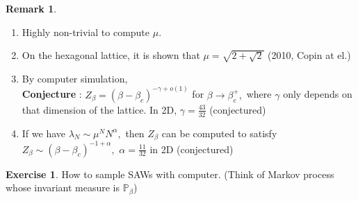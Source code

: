 \documentclass[12pt,a4paper]{report}
\theoremstyle{definition}
\newtheorem*{remark}{Remark}
\newtheorem{ex}{Exercise}
\begin{document}
	\begin{remark} \begin{enumerate}
		\item Highly non-trivial to compute $\mu.$
		\item On the hexagonal lattice, it is shown that $\mu=\sqrt{2+\sqrt{2}}$ (2010, Copin at el.)
		\item By computer simulation,\\
		\textbf{Conjecture} : $Z_\beta=(\beta-\beta_c)^{-\gamma+o(1)}$ for $\beta\to \beta_c^+,$ where $\gamma$ only depends on that dimension of the lattice. In 2D, $\gamma=\frac{43}{32}$ (conjectured)
		\item If we have $\lambda_N\sim \mu^NN^\alpha ,$ then $Z_\beta$ can be computed to satisfy $Z_\beta\sim (\beta-\beta_c)^{-1+\alpha},$ $\alpha=\frac{11}{32}$ in 2D (conjectured) 
	\end{enumerate}
	\end{remark}
	\begin{ex} How to sample SAWs with computer. (Think of Markov process whose invariant measure is $\mathbb{P}_\beta$)\end{ex}

\newpage
\end{document}
